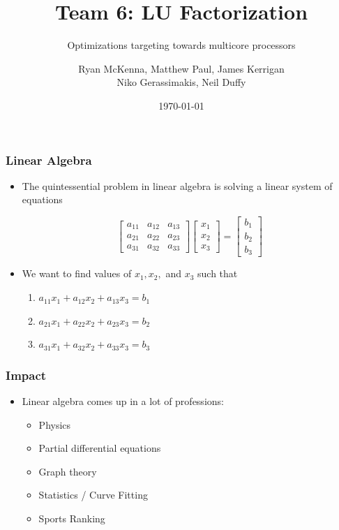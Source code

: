 \documentclass{beamer}
\author{Ryan McKenna, Matthew Paul, James Kerrigan \\
Niko Gerassimakis, Neil Duffy }
\title{Team 6: LU Factorization}
\subtitle{Optimizations targeting towards multicore processors}
\date{\today}
\begin{document}
\frame{\maketitle}

\begin{frame}

\frametitle{Linear Algebra}

\begin{itemize}
\item The quintessential problem in linear algebra is solving a linear system of equations

$$
\begin{bmatrix}
	a_{11} &  a_{12} &  a_{13}  \\
	a_{21}  &  a_{22} &  a_{23}  \\
	a_{31}  &  a_{32}  &  a_{33}
\end{bmatrix}
\begin{bmatrix}
x_1\\x_2\\x_3
\end{bmatrix}
=
\begin{bmatrix}
b_1\\b_2\\b_3
\end{bmatrix}
$$

\item We want to find values of $ x_1, x_2, $ and $ x_3 $ such that 

\begin{enumerate}
\item $ a_{11} x_1 + a_{12} x_2 + a_{13} x_3 = b_1 $
\item $ a_{21} x_1 + a_{22} x_2 + a_{23} x_3 = b_2 $
\item $ a_{31} x_1 + a_{32} x_2 + a_{33} x_3 = b_3 $
\end{enumerate}

\end{itemize}

\end{frame}


\begin{frame}
\frametitle{Impact}

\begin{itemize}
\item Linear algebra comes up in a lot of professions:
\begin{itemize}
\setlength\itemsep{0.25em}
\item Physics
\item Partial differential equations
\item Graph theory
\item Statistics / Curve Fitting
\item Sports Ranking
\end{itemize}

\end{itemize}
	
\end{frame}
\end{document}
